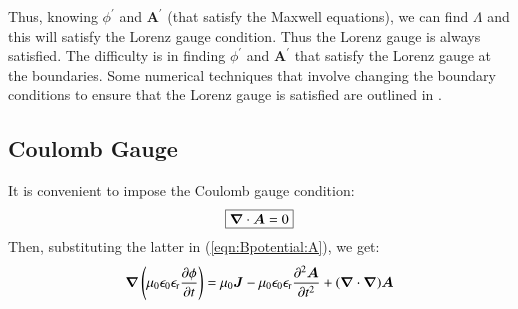 \documentclass{warpdoc}
\newcommand\frameeqn[1]{\fbox{$\displaystyle #1$}}
\renewcommand{\vec}[1]{\bm{#1}}
\begin{document}
%
Thus, knowing $\phi^\prime$ and $\vec{A}^\prime$ (that satisfy the Maxwell equations), we can find $\Lambda$ and this will satisfy the Lorenz gauge condition. Thus the Lorenz gauge is always satisfied. The difficulty is in finding $\phi^\prime$ and $\vec{A}^\prime$ that satisfy the Lorenz gauge at the boundaries. Some numerical techniques that involve changing the boundary conditions to ensure that the Lorenz gauge is satisfied are outlined in \cite{book:2018:garcia}.



\subsection{Coulomb Gauge}

It is convenient to impose the Coulomb gauge condition:
%
\begin{equation}
\frameeqn{
\vec{\nabla}\cdot\vec{A}=0
}
\label{eqn:coulombgauge}
\end{equation}
%
Then, substituting the latter in (\ref{eqn:Bpotential:A}), we get:
%
\begin{equation}
\vec{\nabla}\left(\mu_0\epsilon_0 \epsilon_{\rm r} \frac{\partial \phi}{\partial t}\right)  = \mu_0 \vec{J} - \mu_0 \epsilon_0 \epsilon_{\rm r} \frac{\partial^2 \vec{A} }{\partial t^2} +   (\vec{\nabla}\cdot\vec{\nabla}) \vec{A}
\end{equation}
% 
\end{document}

